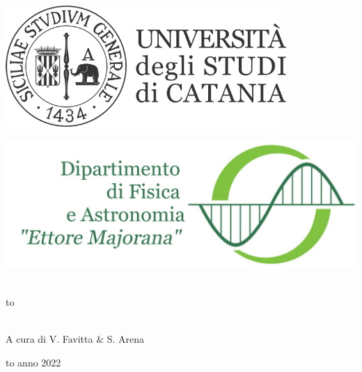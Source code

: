 \documentclass[openany,12pt]{book}%
\newcommand\blankpage{%
    \null
    \thispagestyle{empty}%
    \newpage}
\begin{document}
\thispagestyle{empty}
\begin{center}

\begin{minipage}[c]{0.45\textwidth}
\begin{flushleft}
\includegraphics[width=0.8\textwidth]{logo-unict-orizzontale-grigio.png}
\end{flushleft}
\end{minipage}
\hfill
\begin{minipage}[c]{0.45\textwidth}
\begin{flushright}
\includegraphics[width=\textwidth]{logo_dfa_orizzontale}
\end{flushright}
\end{minipage}\\
\medskip
\hbox to \textwidth{\hrulefill}

\vfill
\vfill

\vfill
\uppercase{}\\

\vfill
\large{A cura di V. Favitta \& S. Arena }

\vfill
\vfill
\hbox to \textwidth{\hrulefill}
{\sc anno 2022}
\end{center}

\afterpage{\blankpage}
\newpage
\end{document}
